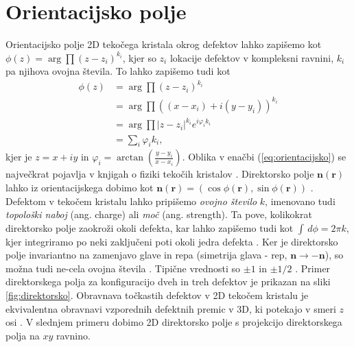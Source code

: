 \documentclass[11pt]{article}
\begin{document}
\section{Orientacijsko polje}
Orientacijsko polje 2D tekočega kristala okrog defektov lahko zapišemo kot $\phi(z)=\arg\prod(z-z_i)^{k_i}$, kjer so $z_i$ lokacije defektov v kompleksni ravnini, $k_i$ pa njihova ovojna števila. To lahko zapišemo tudi kot
\begin{align}
    \phi(z)&=\arg\prod(z-z_i)^{k_i} \nonumber \\
    &=\arg\prod \left((x-x_{i})+i(y-y_i)\right)^{k_i} \nonumber \\
    &=\arg\prod \left|z-z_{i}\right|^{k_{i}}e^{i\varphi_{i}k_{i}} \nonumber \\
    &=\sum_{i}\varphi_{i}k_{i}, \label{eq:orientacijsko}
\end{align}
kjer je $z = x + iy$ in $\varphi_{i}=\arctan\left(\frac{y-y_i}{x-x_i}\right)$. Oblika v enačbi (\ref{eq:orientacijsko}) se največkrat pojavlja v knjigah o fiziki tekočih kristalov \cite{de1993physics, chaikin1995principles}. Direktorsko polje $\bm{n(\bm{r})}$ lahko iz orientacijskega dobimo kot $\bm{n(\bm{r})}=(\cos{\phi(\bm{r})}, \sin{\phi(\bm{r})})$ \cite{foffano2014dynamics, tang2017orientation}. 
Defektom v tekočem kristalu lahko pripišemo \emph{ovojno število} $k$, imenovano tudi  \emph{topološki naboj} \cite{tang2017orientation} (ang. charge) ali \emph{moč} \cite{kleman2003soft} (ang. strength). Ta pove, kolikokrat direktorsko polje zaokroži okoli defekta, kar lahko zapišemo tudi kot $\int\,d\phi = 2\pi k$, kjer integriramo po neki zaključeni poti okoli jedra defekta \cite{vromans2016orientational}. Ker je direktorsko polje invariantno na zamenjavo glave in repa (simetrija glava - rep, $\bm{n} \rightarrow -\bm{n}$), so možna tudi ne-cela ovojna števila \cite{blinov2010structure, chaikin1995principles}. Tipične vrednosti so $\pm 1$ in $\pm 1/2$ \cite{foffano2014dynamics, raynes1993liquid}.
 Primer direktorskega polja za konfiguracijo dveh in treh defektov je prikazan na sliki \ref{fig:direktorsko}.
 Obravnava točkastih defektov v 2D tekočem kristalu je ekvivalentna obravnavi vzporednih defektnih premic v 3D, ki potekajo v smeri $z$ osi \cite{de1993physics, kleman2003soft, chandrasekhar1992liquid}. V slednjem primeru dobimo 2D direktorsko polje s projekcijo direktorskega polja na $xy$ ravnino. 
\end{document}
